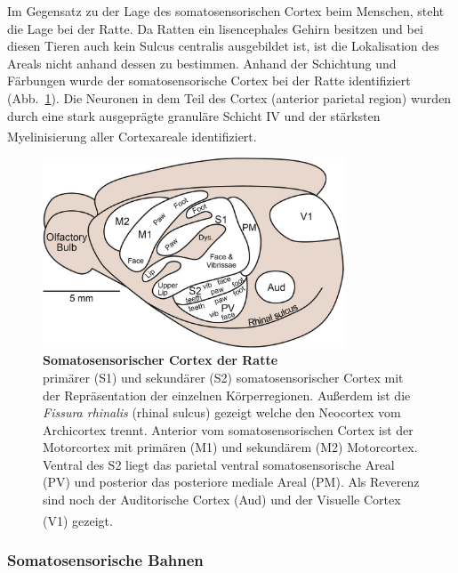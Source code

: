 \documentclass[12pt,a4paper,pdftex]{article}
\begin{document}
Im Gegensatz zu der Lage des somatosensorischen Cortex beim Menschen, steht die Lage bei der Ratte. Da Ratten ein lisencephales Gehirn besitzen und bei diesen Tieren auch kein Sulcus centralis ausgebildet ist, ist die Lokalisation des Areals nicht anhand dessen zu bestimmen. Anhand der Schichtung und Färbungen wurde der somatosensorische Cortex bei der Ratte identifiziert (Abb.~\ref{fig:S1_Cortex_Ratte}). Die Neuronen in dem Teil des Cortex (anterior parietal region) wurden durch eine stark ausgeprägte granuläre Schicht IV und der stärksten Myelinisierung aller Cortexareale identifiziert. \textsuperscript{\cite[22]{paxinos2014rat}}
\\
\begin{figure}[H]
    \centering
    \includegraphics[width = 0.8\textwidth] {pictures/somatosensory/Somato_cortex_ratte.png}
    \caption[Somatosensorischer Cortex der Ratte]{\textbf{Somatosensorischer Cortex der Ratte}\\
    primärer (S1) und sekundärer (S2) somatosensorischer Cortex mit der Repräsentation der einzelnen Körperregionen. Außerdem ist die \textit{Fissura rhinalis} (rhinal sulcus) gezeigt welche den Neocortex vom Archicortex trennt. Anterior vom somatosensorischen Cortex ist der Motorcortex mit primären (M1) und sekundärem (M2) Motorcortex. Ventral des S2 liegt das parietal ventral somatosensorische Areal (PV) und posterior das posteriore mediale Areal (PM). Als Reverenz sind noch der Auditorische Cortex (Aud) und der Visuelle Cortex (V1) gezeigt. \textsuperscript{\cite[24]{paxinos2014rat}}}
    \label{fig:S1_Cortex_Ratte}
\end{figure}

\subsubsection*{Somatosensorische Bahnen}
\end{document}
